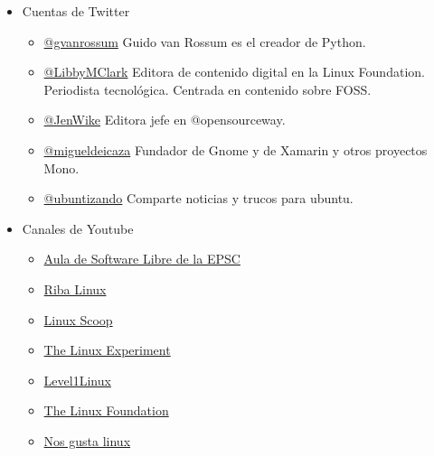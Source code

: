 \begin{itemize}
    \item Cuentas de Twitter
    \begin{itemize}
        \item \href{https://twitter.com/gvanrossum}{@gvanrossum} Guido van Rossum es el creador de Python.
        \item \href{https://twitter.com/LibbyMClark}{@LibbyMClark} Editora de contenido digital en la Linux Foundation. Periodista tecnológica. Centrada en contenido sobre FOSS.
        \item \href{https://twitter.com/JenWike}{@JenWike} Editora jefe en @opensourceway.
        \item \href{https://twitter.com/migueldeicaza}{@migueldeicaza} Fundador de Gnome y de Xamarin y otros proyectos Mono. 
        \item \href{https://twitter.com/ubuntuzando}{@ubuntizando} Comparte noticias y trucos para ubuntu.
    \end{itemize}
    \item Canales de Youtube
    \begin{itemize}
        \item \href{https://www.youtube.com/channel/UCfWiR5j-cbKcGTi9faK8P6w}{Aula de Software Libre de la EPSC}
        \item \href{https://www.youtube.com/user/TheRibalinux/videos}{Riba Linux}
        \item \href{https://www.youtube.com/user/linuxscoop}{Linux Scoop}
        \item \href{https://www.youtube.com/channel/UC5UAwBUum7CPN5buc-_N1Fw}{The Linux Experiment}
        \item \href{https://www.youtube.com/channel/UCOWcZ6Wicl-1N34H0zZe38w}{Level1Linux}
        \item \href{https://www.youtube.com/user/TheLinuxFoundation}{The Linux Foundation}
        \item \href{https://www.youtube.com/user/nosgustalinux}{Nos gusta linux}
    \end{itemize}
\end{itemize}